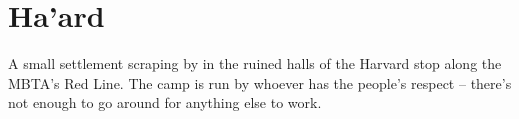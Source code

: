 \documentclass[././main.tex]{subfiles}
\begin{document}
\section{Ha'ard}
A small settlement scraping by in the ruined halls of the Harvard stop along the MBTA's Red Line. The camp is run by whoever has the people's respect -- there's not enough to go around for anything else to work. 
\end{document}
